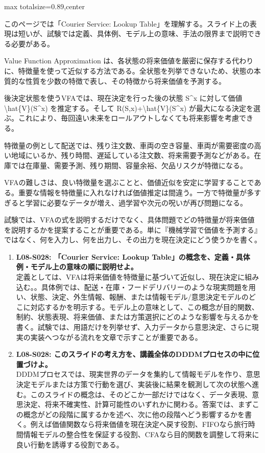\begin{minipage}[t]{0.58\textwidth}
\begin{adjustbox}{max totalsize={\textwidth}{0.89\textheight},center}
\begin{minipage}{\textwidth}\scriptsize
{}このページでは「Courier Service: Lookup Table」を理解する。スライド上の表現は短いが、試験では定義、具体例、モデル上の意味、手法の限界まで説明できる必要がある。\par
Value Function Approximation は、各状態の将来価値を厳密に保存する代わりに、特徴量を使って近似する方法である。全状態を列挙できないため、状態の本質的な性質を少数の特徴で表し、その特徴から将来価値を予測する。\par
後決定状態を使うVFAでは、現在決定を行った後の状態 S\textasciicircum{}x に対して価値 \textbackslash{}hat\{V\}(S\textasciicircum{}x) を推定する。そして R(S,x)+\textbackslash{}hat\{V\}(S\textasciicircum{}x) が最大になる決定を選ぶ。これにより、毎回遠い未来をロールアウトしなくても将来影響を考慮できる。\par
特徴量の例として配送では、残り注文数、車両の空き容量、車両が需要密度の高い地域にいるか、残り時間、遅延している注文数、将来需要予測などがある。在庫では在庫量、需要予測、残り期間、容量余裕、欠品リスクが特徴になる。\par
VFAの難しさは、良い特徴量を選ぶことと、価値近似を安定に学習することである。重要な情報を特徴量に入れなければ価値推定は間違う。一方で特徴量が多すぎると学習に必要なデータが増え、過学習や次元の呪いが再び問題になる。\par
試験では、VFAの式を説明するだけでなく、具体問題でどの特徴量が将来価値を説明するかを提案することが重要である。単に『機械学習で価値を予測する』ではなく、何を入力し、何を出力し、その出力を現在決定にどう使うかを書く。\par{}\begin{enumerate}\item \textbf{L08-S028: 「Courier Service: Lookup Table」の概念を、定義・具体例・モデル上の意味の順に説明せよ。}\\定義としては、VFAは将来価値を特徴量に基づいて近似し、現在決定に組み込む。。具体例では、配送・在庫・フードデリバリーのような現実問題を用い、状態、決定、外生情報、報酬、または情報モデル/意思決定モデルのどこに対応するかを明示する。モデル上の意味として、この概念が目的関数、制約、状態表現、将来価値、または方策選択にどのような影響を与えるかを書く。試験では、用語だけを列挙せず、入力データから意思決定、さらに現実の実装へつながる流れを文章で示すことが重要である。\item \textbf{L08-S028: このスライドの考え方を、講義全体のDDDMプロセスの中に位置づけよ。}\\DDDMプロセスでは、現実世界のデータを集約して情報モデルを作り、意思決定モデルまたは方策で行動を選び、実装後に結果を観測して次の状態へ進む。このスライドの概念は、そのどこか一部だけではなく、データ表現、意思決定、将来不確実性、計算可能性のいずれかに関わる。答案では、まずこの概念がどの段階に属するかを述べ、次に他の段階へどう影響するかを書く。例えば価値関数なら将来価値を現在決定へ戻す役割、FIFOなら旅行時間情報モデルの整合性を保証する役割、CFAなら目的関数を調整して将来に良い行動を誘導する役割である。\end{enumerate}

\end{minipage}
\end{adjustbox}
\end{minipage}
